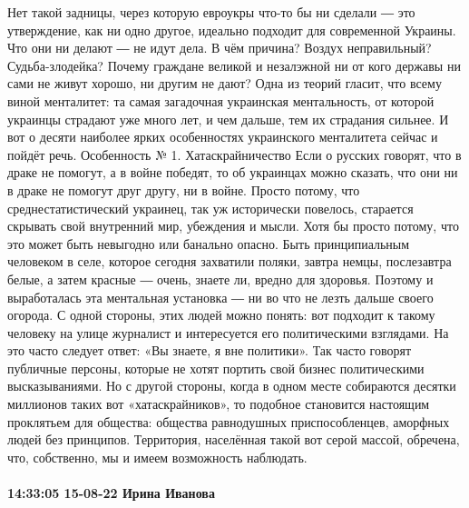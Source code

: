 Нет такой задницы, через которую евроукры что-то бы ни сделали ― это
утверждение, как ни одно другое, идеально подходит для современной Украины. Что
они ни делают ― не идут дела. В чём причина? Воздух неправильный?
Судьба-злодейка? Почему граждане великой и незалэжной ни от кого державы ни
сами не живут хорошо, ни другим не дают? Одна из теорий гласит, что всему виной
менталитет: та самая загадочная украинская ментальность, от которой украинцы
страдают уже много лет, и чем дальше, тем их страдания сильнее. И вот о десяти
наиболее ярких особенностях украинского менталитета сейчас и пойдёт
речь. Особенность № 1. Хатаскрайничество Если о русских говорят, что в драке
не помогут, а в войне победят, то об украинцах можно сказать, что они ни в
драке не помогут друг другу, ни в войне. Просто потому, что
среднестатистический украинец, так уж исторически повелось, старается скрывать
свой внутренний мир, убеждения и мысли. Хотя бы просто потому, что это может
быть невыгодно или банально опасно. Быть принципиальным человеком в селе,
которое сегодня захватили поляки, завтра немцы, послезавтра белые, а затем
красные ― очень, знаете ли, вредно для здоровья. Поэтому и выработалась эта
ментальная установка ― ни во что не лезть дальше своего огорода. С одной
стороны, этих людей можно понять: вот подходит к такому человеку на улице
журналист и интересуется его политическими взглядами. На это часто следует
ответ: «Вы знаете, я вне политики». Так часто говорят публичные персоны,
которые не хотят портить свой бизнес политическими высказываниями. Но с другой
стороны, когда в одном месте собираются десятки миллионов таких вот
«хатаскрайников», то подобное становится настоящим проклятьем для общества:
общества равнодушных приспособленцев, аморфных людей без принципов. Территория,
населённая такой вот серой массой, обречена, что, собственно, мы и имеем
возможность наблюдать.

\paragraph{14:33:05 15-08-22 Ирина Иванова}

